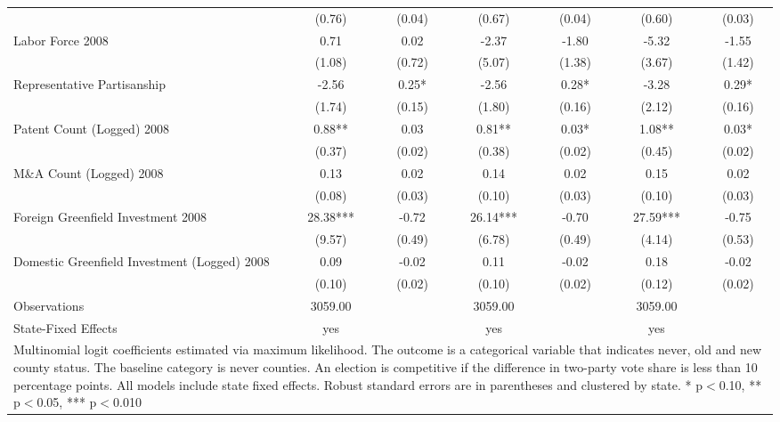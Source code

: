 \begin{table}[!htbp]
\begin{tabular}{l*{6}{c}}
                    &      (0.76)   &      (0.04)   &      (0.67)   &      (0.04)   &      (0.60)   &      (0.03)   \\
Labor Force 2008    &        0.71   &        0.02   &       -2.37   &       -1.80   &       -5.32   &       -1.55   \\
                    &      (1.08)   &      (0.72)   &      (5.07)   &      (1.38)   &      (3.67)   &      (1.42)   \\
Representative Partisanship&       -2.56   &        0.25*  &       -2.56   &        0.28*  &       -3.28   &        0.29*  \\
                    &      (1.74)   &      (0.15)   &      (1.80)   &      (0.16)   &      (2.12)   &      (0.16)   \\
Patent Count (Logged) 2008&        0.88** &        0.03   &        0.81** &        0.03*  &        1.08** &        0.03*  \\
                    &      (0.37)   &      (0.02)   &      (0.38)   &      (0.02)   &      (0.45)   &      (0.02)   \\
M\&A Count (Logged) 2008&        0.13   &        0.02   &        0.14   &        0.02   &        0.15   &        0.02   \\
                    &      (0.08)   &      (0.03)   &      (0.10)   &      (0.03)   &      (0.10)   &      (0.03)   \\
Foreign Greenfield Investment 2008&       28.38***&       -0.72   &       26.14***&       -0.70   &       27.59***&       -0.75   \\
                    &      (9.57)   &      (0.49)   &      (6.78)   &      (0.49)   &      (4.14)   &      (0.53)   \\
Domestic Greenfield Investment (Logged) 2008&        0.09   &       -0.02   &        0.11   &       -0.02   &        0.18   &       -0.02   \\
                    &      (0.10)   &      (0.02)   &      (0.10)   &      (0.02)   &      (0.12)   &      (0.02)   \\
\hline
Observations        &     3059.00   &               &     3059.00   &               &     3059.00   &               \\
State-Fixed Effects &         yes   &               &         yes   &               &         yes   &               \\
\hline\hline
\multicolumn{7}{p{\linewidth}}{\footnotesize Multinomial logit coefficients estimated via maximum likelihood. The outcome is a categorical variable that indicates  never, old and new county status. The baseline category is never counties. An election is competitive if the difference in two-party vote share is less than 10 percentage points. All models include state fixed effects. Robust standard errors are in parentheses and clustered by state. * p$<$0.10, ** p$<$0.05, *** p$<$0.010}\\
\end{tabular}
\end{table}
